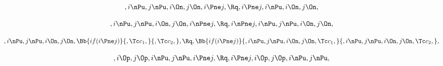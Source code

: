 \[, i \nPu, j \nPu, i \On, j \On, i \Pne j, \Rq , i \Pne j, i \nPu, i \On, j \On, \]

\[, i \nPu, j \nPu, i \On, j \On, i \nPne j, \Rq , i \nPne j, i \nPu, j \nPu, i \On, j \On, \]

\bigskip
\bigskip

\[, i \nPu, j \nPu, i \On, j \On, \Bb{if(i \Pne j)}{,\Tc c_1,}{,\Tc c_2,}, \Rq ,\Bb{if(i \Pne j)}{, i \nPu, j \nPu, i \On, j \On,\Tc c_1,}{, i \nPu, j \nPu, i \On, j \On, \Tc c_2,}, \]

\bigskip
\bigskip
\bigskip
\bigskip







\[, i \Op, j \Op, i \nPu, j \nPu, i \Pne j, \Rq , i \Pne j, i \Op, j \Op, i \nPu, j \nPu, \]


